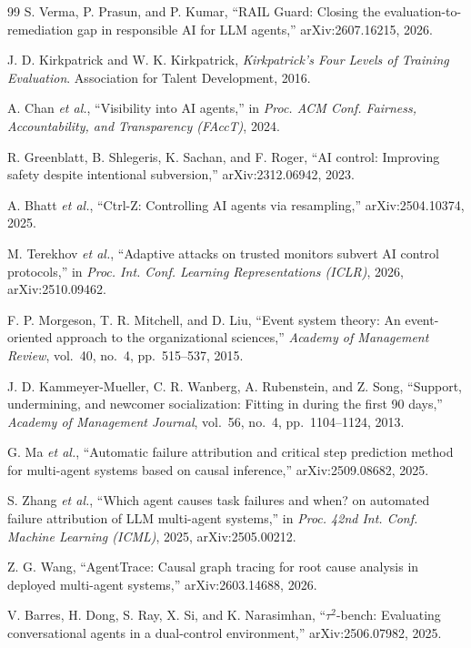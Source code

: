 \documentclass[conference]{IEEEtran}
\begin{document}
\begin{thebibliography}{99}
S. Verma, P. Prasun, and P. Kumar, ``RAIL Guard: Closing the
evaluation-to-remediation gap in responsible AI for LLM agents,'' arXiv:2607.16215, 2026.

J. D. Kirkpatrick and W. K. Kirkpatrick, \emph{Kirkpatrick's Four Levels of
Training Evaluation}. Association for Talent Development, 2016.

A. Chan \emph{et al.}, ``Visibility into AI agents,'' in \emph{Proc. ACM Conf.
Fairness, Accountability, and Transparency (FAccT)}, 2024.

R. Greenblatt, B. Shlegeris, K. Sachan, and F. Roger, ``AI control: Improving
safety despite intentional subversion,'' arXiv:2312.06942, 2023.

A. Bhatt \emph{et al.}, ``Ctrl-Z: Controlling AI agents via resampling,'' arXiv:2504.10374, 2025.

M. Terekhov \emph{et al.}, ``Adaptive attacks on trusted monitors subvert AI
control protocols,'' in \emph{Proc. Int. Conf. Learning Representations
(ICLR)}, 2026, arXiv:2510.09462.

F. P. Morgeson, T. R. Mitchell, and D. Liu, ``Event system theory: An
event-oriented approach to the organizational sciences,'' \emph{Academy of
Management Review}, vol.~40, no.~4, pp.~515--537, 2015.

J. D. Kammeyer-Mueller, C. R. Wanberg, A. Rubenstein, and Z. Song, ``Support,
undermining, and newcomer socialization: Fitting in during the first 90 days,''
\emph{Academy of Management Journal}, vol.~56, no.~4, pp.~1104--1124, 2013.

G. Ma \emph{et al.}, ``Automatic failure attribution and critical step
prediction method for multi-agent systems based on causal inference,'' arXiv:2509.08682, 2025.

S. Zhang \emph{et al.}, ``Which agent causes task failures and when? on
automated failure attribution of LLM multi-agent systems,'' in \emph{Proc. 42nd
Int. Conf. Machine Learning (ICML)}, 2025, arXiv:2505.00212.

Z. G. Wang, ``AgentTrace: Causal graph tracing for root cause analysis in
deployed multi-agent systems,'' arXiv:2603.14688, 2026.

V. Barres, H. Dong, S. Ray, X. Si, and K. Narasimhan, ``$\tau^2$-bench:
Evaluating conversational agents in a dual-control environment,'' arXiv:2506.07982, 2025.


\end{thebibliography}
\end{document}
